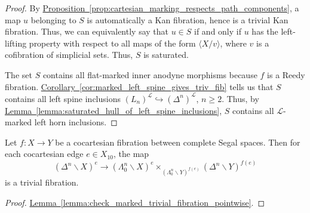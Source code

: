 \documentclass[main.tex]{subfiles}
\begin{document}
\begin{proof}
  By \hyperref[prop:cartesian_marking_respects_path_components]{Proposition~\ref*{prop:cartesian_marking_respects_path_components}}, a map $u$ belonging to $S$ is automatically a Kan fibration, hence is a trivial Kan fibration. Thus, we can equivalently say that $u \in S$ if and only if $u$ has the left-lifting property with respect to all maps of the form $\langle X / v \rangle$, where $v$ is a cofibration of simplicial sets. Thus, $S$ is saturated.

  The set $S$ contains all flat-marked inner anodyne morphisms because $f$ is a Reedy fibration. \hyperref[cor:marked_left_spine_gives_triv_fib]{Corollary~\ref*{cor:marked_left_spine_gives_triv_fib}} tells us that $S$ contains all left spine inclusions $(L_{n})^{\mathcal{L}} \hookrightarrow (\Delta^{n})^{\mathcal{L}}$, $n \geq 2$. Thus, by \hyperref[lemma:saturated_hull_of_left_spine_inclusions]{Lemma~\ref*{lemma:saturated_hull_of_left_spine_inclusions}}, $S$ contains all $\mathcal{L}$-marked left horn inclusions.
\end{proof}

\begin{corollary}
  \label{cor:pointwise_left_horn_condition}
  Let $f\colon X \to Y$ be a cocartesian fibration between complete Segal spaces. Then for each cocartesian edge $e \in X_{10}$, the map
  \begin{equation*}
    (\Delta^{n} \backslash X)^{e} \to (\Lambda^{n}_{0} \backslash X)^{e} \times_{(\Lambda^{n}_{0} \backslash Y)^{f(e)}} (\Delta^{n} \backslash Y)^{f(e)}
  \end{equation*}
  is a trivial fibration.
\end{corollary}
\begin{proof}
  \hyperref[lemma:check_marked_trivial_fibration_pointwise]{Lemma~\ref*{lemma:check_marked_trivial_fibration_pointwise}}.
\end{proof}
\end{document}
